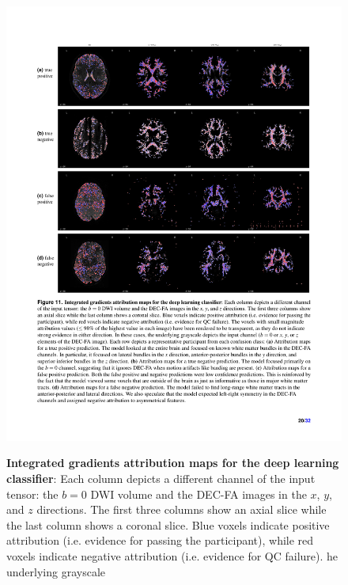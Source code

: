\documentclass[fleqn,10pt,inline]{wlscirep}
\begin{document}
\begin{figure}[tbp]
    {\label{fig:ig:true-pos}}
    {\label{fig:ig:true-neg}}
    {\label{fig:ig:false-pos}}
    {\label{fig:ig:false-neg}}
    \centering
    \includegraphics[width=\linewidth]{attribution_maps.pdf}
    \caption{%
        {\bf Integrated gradients attribution maps for the deep learning classifier}:
        Each column depicts a different channel of the input tensor: the $b=0$
        DWI volume and the DEC-FA images in the $x$, $y$, and $z$ directions.
        The first three columns show an axial slice while the last column
        shows a coronal slice. Blue voxels indicate positive attribution (i.e.
        evidence for passing the participant), while red voxels indicate negative
        attribution (i.e. evidence for QC failure). he underlying grayscale
}
\end{figure}
\end{document}

